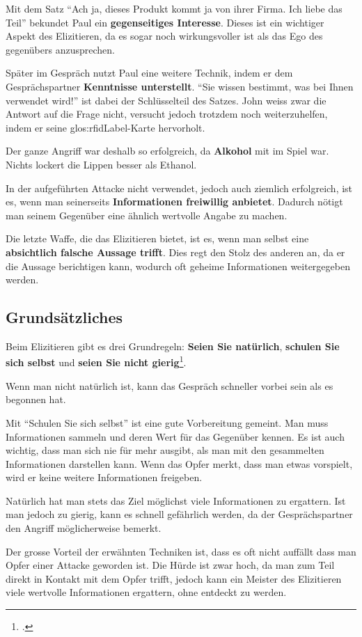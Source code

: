 Mit dem Satz "`Ach ja, dieses Produkt kommt ja von ihrer Firma. Ich liebe das Teil"' bekundet Paul ein \textbf{gegenseitiges Interesse}. Dieses ist ein wichtiger Aspekt des Elizitieren, da es sogar noch wirkungsvoller ist als das Ego des gegenübers anzusprechen.

Später im Gespräch nutzt Paul eine weitere Technik, indem er dem Gesprächspartner \textbf{Kenntnisse unterstellt}. "`Sie wissen bestimmt, was bei Ihnen verwendet wird!"' ist dabei der Schlüsselteil des Satzes. John weiss zwar die Antwort auf die Frage nicht, versucht jedoch trotzdem noch weiterzuhelfen, indem er seine \gls{glos:rfidLabel}-Karte hervorholt.

Der ganze Angriff war deshalb so erfolgreich, da \textbf{Alkohol} mit im Spiel war. Nichts lockert die Lippen besser als Ethanol.

In der aufgeführten Attacke nicht verwendet, jedoch auch ziemlich erfolgreich, ist es, wenn man seinerseits \textbf{Informationen freiwillig anbietet}. Dadurch nötigt man seinem Gegenüber eine ähnlich wertvolle Angabe zu machen.

Die letzte Waffe, die das Elizitieren bietet, ist es, wenn man selbst eine \textbf{absichtlich falsche Aussage trifft}. Dies regt den Stolz des anderen an, da er die Aussage berichtigen kann, wodurch oft geheime Informationen weitergegeben werden.

\subsection{Grundsätzliches}
Beim Elizitieren gibt es drei Grundregeln: \textbf{Seien Sie natürlich}, \textbf{schulen Sie sich selbst} und \textbf{seien Sie nicht gierig}\footcite{human_hacking}. 

Wenn man nicht natürlich ist, kann das Gespräch schneller vorbei sein als es begonnen hat. 

Mit "`Schulen Sie sich selbst"' ist eine gute Vorbereitung gemeint. Man muss Informationen sammeln und deren Wert für das Gegenüber kennen. Es ist auch wichtig, dass man sich nie für mehr ausgibt, als man mit den gesammelten Informationen darstellen kann. Wenn das Opfer merkt, dass man etwas vorspielt, wird er keine weitere Informationen freigeben.

Natürlich hat man stets das Ziel möglichst viele Informationen zu ergattern. Ist man jedoch zu gierig, kann es schnell gefährlich werden, da der Gesprächspartner den Angriff möglicherweise bemerkt.

Der grosse Vorteil der erwähnten Techniken ist, dass es oft nicht auffällt dass man Opfer einer Attacke geworden ist. Die Hürde ist zwar hoch, da man zum Teil direkt in Kontakt mit dem Opfer trifft, jedoch kann ein Meister des Elizitieren viele wertvolle Informationen ergattern, ohne entdeckt zu werden.

